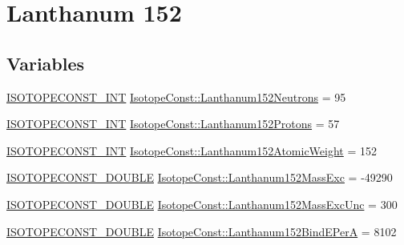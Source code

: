 \hypertarget{group___isotope_const-_lanthanum-_la152}{}\section{Lanthanum 152}
\label{group___isotope_const-_lanthanum-_la152}
\subsection*{Variables}
\begin{DoxyCompactItemize}
\item 
\mbox{\hyperlink{group___isotope_const-_macros_ga5f18360b3e99483a35c32d789e62621c}{I\+S\+O\+T\+O\+P\+E\+C\+O\+N\+S\+T\+\_\+\+I\+NT}} \mbox{\hyperlink{group___isotope_const-_lanthanum-_la152_gad9c4a5deae326c0c8f46b177d63a30b4}{Isotope\+Const\+::\+Lanthanum152\+Neutrons}} = 95
\item 
\mbox{\hyperlink{group___isotope_const-_macros_ga5f18360b3e99483a35c32d789e62621c}{I\+S\+O\+T\+O\+P\+E\+C\+O\+N\+S\+T\+\_\+\+I\+NT}} \mbox{\hyperlink{group___isotope_const-_lanthanum-_la152_ga088032506273e4666a02e66b5584bdae}{Isotope\+Const\+::\+Lanthanum152\+Protons}} = 57
\item 
\mbox{\hyperlink{group___isotope_const-_macros_ga5f18360b3e99483a35c32d789e62621c}{I\+S\+O\+T\+O\+P\+E\+C\+O\+N\+S\+T\+\_\+\+I\+NT}} \mbox{\hyperlink{group___isotope_const-_lanthanum-_la152_gaf589cfb0a71afc30a1fce3626eeb2691}{Isotope\+Const\+::\+Lanthanum152\+Atomic\+Weight}} = 152
\item 
\mbox{\hyperlink{group___isotope_const-_macros_ga8f45a7272ce02c0b4c65c44636ed719a}{I\+S\+O\+T\+O\+P\+E\+C\+O\+N\+S\+T\+\_\+\+D\+O\+U\+B\+LE}} \mbox{\hyperlink{group___isotope_const-_lanthanum-_la152_gabb71b6f5b452ea85a2e40ca3df3b9cee}{Isotope\+Const\+::\+Lanthanum152\+Mass\+Exc}} = -\/49290
\item 
\mbox{\hyperlink{group___isotope_const-_macros_ga8f45a7272ce02c0b4c65c44636ed719a}{I\+S\+O\+T\+O\+P\+E\+C\+O\+N\+S\+T\+\_\+\+D\+O\+U\+B\+LE}} \mbox{\hyperlink{group___isotope_const-_lanthanum-_la152_gaae88aaec4e2b27643a0a87453870308f}{Isotope\+Const\+::\+Lanthanum152\+Mass\+Exc\+Unc}} = 300
\item 
\mbox{\hyperlink{group___isotope_const-_macros_ga8f45a7272ce02c0b4c65c44636ed719a}{I\+S\+O\+T\+O\+P\+E\+C\+O\+N\+S\+T\+\_\+\+D\+O\+U\+B\+LE}} \mbox{\hyperlink{group___isotope_const-_lanthanum-_la152_ga8a6e9db09deddd6d651b6e1429637908}{Isotope\+Const\+::\+Lanthanum152\+Bind\+E\+PerA}} = 8102
\item 

\end{DoxyCompactItemize}
